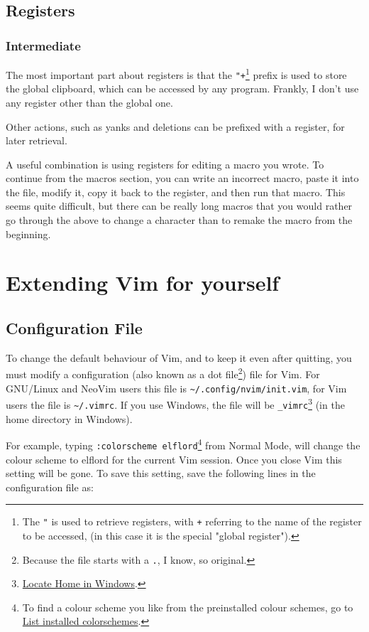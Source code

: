 \documentclass[11pt]{article}
\begin{document}
\subsection{Registers}
\label{sec:org627195c}
\subsubsection{Intermediate}
\label{sec:org2980b2f}
The most important part about registers is that the \texttt{"+}\footnote{The \texttt{"} is used to retrieve registers, with \texttt{+} referring to 
the name of the register to be accessed, (in this case it is the 
special "global register").} prefix is used
to store the global clipboard, which can be accessed by any program. Frankly, I
don't use any register other than the global one.

Other actions, such as yanks and deletions can be prefixed with a register, for
later retrieval.

A useful combination is using registers for editing a macro you wrote. To
continue from the macros section, you can write an incorrect macro, paste it
into the file, modify it, copy it back to the register, and then run that macro.
This seems quite difficult, but there can be really long macros that you would
rather go through the above to change a character than to remake the macro from
the beginning.
\section{Extending Vim for yourself}
\label{sec:orgf1a3d45}
\subsection{Configuration File}
\label{sec:org205fa1b}
To change the default behaviour of Vim, and to keep it even after quitting, you
must modify a configuration (also known as a dot file\footnote{Because the file starts with a \texttt{.}, I know, so original.}) file for Vim. For
GNU/Linux and NeoVim users this file is \texttt{\textasciitilde{}/.config/nvim/init.vim}, for Vim users
the file is \texttt{\textasciitilde{}/.vimrc}. If you use Windows, the file will be \texttt{\_vimrc}\footnote{\href{https://superuser.com/questions/86246/where-should-the-vimrc-file-be-located-on-windows-7}{Locate Home in Windows}.} (in
the home directory in Windows).

For example, typing \texttt{:colorscheme elflord}\footnote{To find a colour scheme you like from the preinstalled colour 
schemes, go to \href{https://stackoverflow.com/questions/7331940/how-to-get-the-list-of-all-installed-color-schemes-in-vim}{List installed colorschemes}.} from Normal Mode, will change
the colour scheme to elflord for the current Vim session. Once you close Vim
this setting will be gone. To save this setting, save the following lines in the
configuration file as:
\end{document}
